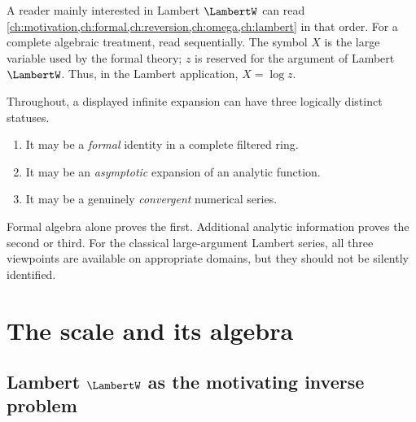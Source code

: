 \documentclass[11pt,oneside,openany]{book}
\begin{document}
A reader mainly interested in Lambert \(\LambertW\) can read
\cref{ch:motivation,ch:formal,ch:reversion,ch:omega,ch:lambert} in that order.
For a complete algebraic treatment, read sequentially.  The symbol \(X\) is the
large variable used by the formal theory; \(z\) is reserved for the argument of
Lambert \(\LambertW\).  Thus, in the Lambert application, \(X=\log z\).

\begin{cautionbox}
Throughout, a displayed infinite expansion can have three logically distinct
statuses.
\begin{enumerate}
\item It may be a \emph{formal} identity in a complete filtered ring.
\item It may be an \emph{asymptotic} expansion of an analytic function.
\item It may be a genuinely \emph{convergent} numerical series.
\end{enumerate}
Formal algebra alone proves the first.  Additional analytic information proves
the second or third.  For the classical large-argument Lambert series, all
three viewpoints are available on appropriate domains, but they should not be
silently identified.
\end{cautionbox}

\tableofcontents

\mainmatter

\part{The scale and its algebra}

\chapter{Lambert \texorpdfstring{\(\LambertW\)}{W} as the motivating inverse problem}
\label{ch:motivation}
\end{document}
